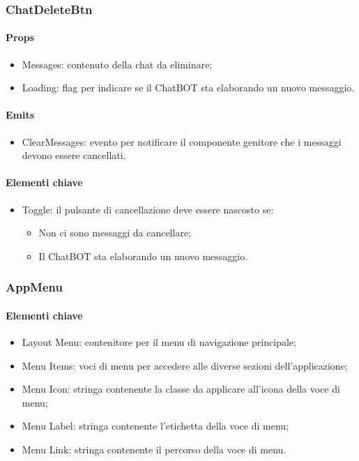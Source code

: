 \subsubsection{ChatDeleteBtn}

\paragraph*{Props}
\begin{itemize}
  \item Messages: contenuto della chat da eliminare;
  \item Loading: flag per indicare se il ChatBOT sta elaborando un nuovo messaggio.
\end{itemize}

\paragraph*{Emits}
\begin{itemize}
  \item ClearMessages: evento per notificare il componente genitore che i messaggi devono essere cancellati.
\end{itemize}

\paragraph*{Elementi chiave}
\begin{itemize}
  \item Toggle: il pulsante di cancellazione deve essere nascosto se:
  \begin{itemize}
    \item Non ci sono messaggi da cancellare;
    \item Il ChatBOT sta elaborando un nuovo messaggio.
  \end{itemize}
\end{itemize}

\subsubsection{AppMenu}

\paragraph*{Elementi chiave}
\begin{itemize}
  \item Layout Menu: contenitore per il menu di navigazione principale;
  \item Menu Items: voci di menu per accedere alle diverse sezioni dell'applicazione;
  \item Menu Icon: stringa contenente la classe da applicare all'icona della voce di menu;
  \item Menu Label: stringa contenente l'etichetta della voce di menu;
  \item Menu Link: stringa contenente il percorso della voce di menu.
\end{itemize}


